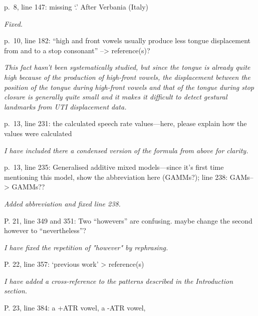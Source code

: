 \documentclass[]{article}
\begin{document}
p.~8, line 147: missing `.' After Verbania (Italy)

\begin{adjustwidth}{1cm}{} \textit{
Fixed.
} \end{adjustwidth}

p.~10, line 182: ``high and front vowels usually produce less tongue
displacement from and to a stop consonant'' --\textgreater{}
reference(s)?

\begin{adjustwidth}{1cm}{} \textit{
This fact hasn't been systematically studied, but since the tongue is already quite high because of the production of high-front vowels, the displacement between the position of the tongue during high-front vowels and that of the tongue during stop closure is generally quite small and it makes it difficult to detect gestural landmarks from UTI displacement data.
} \end{adjustwidth}

p.~13, line 231: the calculated speech rate values---here, please
explain how the values were calculated

\begin{adjustwidth}{1cm}{} \textit{
I have included there a condensed version of the formula from above for clarity.
} \end{adjustwidth}

p.~13, line 235: Generalised additive mixed models---since it's first
time mentioning this model, show the abbreviation here (GAMMs?); line
238: GAMs--\textgreater{} GAMMs??

\begin{adjustwidth}{1cm}{} \textit{
Added abbreviation and fixed line 238.
} \end{adjustwidth}

P. 21, line 349 and 351: Two ``howevers'' are confusing. maybe change
the second however to ``nevertheless''?

\begin{adjustwidth}{1cm}{} \textit{
I have fixed the repetition of "however" by rephrasing.
} \end{adjustwidth}

P. 22, line 357: `previous work' \textgreater{} reference(s)

\begin{adjustwidth}{1cm}{} \textit{
I have added a cross-reference to the patterns described in the Introduction section.
} \end{adjustwidth}

P. 23, line 384: a +ATR vowel, a -ATR vowel,
\end{document}
